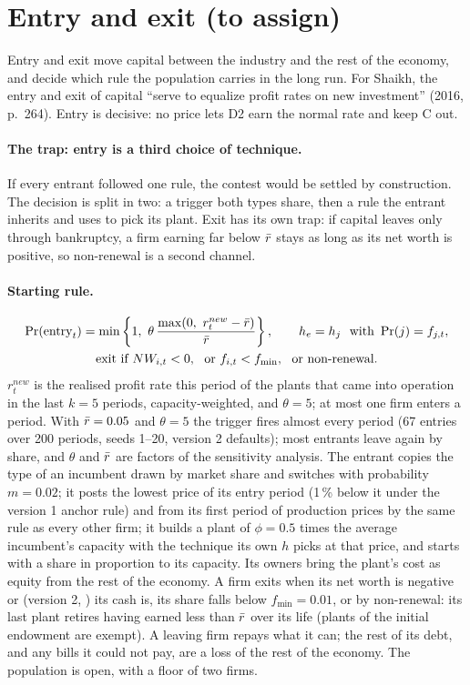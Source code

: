 \section{Entry and exit (to assign)}\label{sec:entry}

Entry and exit move capital between the industry and the rest of the economy, and decide
which rule the population carries in the long run. For Shaikh, the entry and exit of
capital ``serve to equalize profit rates on new investment'' (2016, p.~264). Entry is
decisive: no price lets D2 earn the normal rate and keep C out.

\paragraph{The trap: entry is a third choice of technique.} If every entrant followed one
rule, the contest would be settled by construction. The decision is split in two: a trigger
both types share, then a rule the entrant inherits and uses to pick its plant. Exit has its
own trap: if capital leaves only through bankruptcy, a firm earning far below $\bar r$ stays
as long as its net worth is positive, so non-renewal is a second channel.

\paragraph{Starting rule.}
\begin{gather*}
\Pr(\text{entry}_t) = \min\left\{1,\ \theta\,\frac{\max(0,\ r^{new}_t - \rbar)}{\rbar}\right\}, \qquad
h_e = h_j \ \text{ with } \Pr(j) = f_{j,t}, \\
\text{exit if } NW_{i,t} < 0, \ \text{ or } f_{i,t} < f_{\min}, \ \text{ or non-renewal}.
\end{gather*}
$r^{new}_t$ is the realised profit rate this period of the plants that came into operation
in the last $k = 5$ periods, capacity-weighted, and $\theta = 5$; at most one firm enters a
period. With $\bar r = 0.05$ and $\theta = 5$ the trigger fires almost every period (67
entries over 200 periods, seeds 1--20, version 2 defaults); most entrants leave again by
share, and $\theta$ and $\bar r$ are factors of the sensitivity analysis. The entrant copies the type of an incumbent drawn by market share and switches with
probability $m = 0.02$; it posts the lowest price of its entry period (1\,\% below it under
the version 1 anchor rule) and from its first period of production prices by the same rule as
every other firm; it builds a plant of
$\phi = 0.5$ times the average incumbent's capacity with the technique its own $h$ picks at
that price, and starts with a share in proportion to its capacity. Its owners bring the
plant's cost as equity from the rest of the economy. A firm exits when its net worth is
negative or (version 2, ) its cash is, its share falls below $f_{\min} = 0.01$, or by non-renewal: its last plant retires
having earned less than $\bar r$ over its life (plants of the initial endowment are exempt).
A leaving firm repays what it can; the rest of its debt, and any bills it could not pay,
are a loss of the rest of the economy. The population is open, with a floor of two firms.

